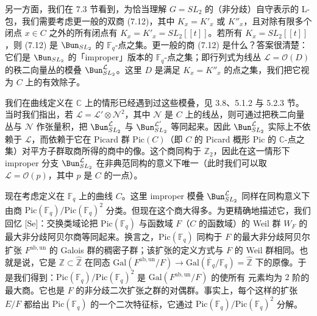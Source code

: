 另一方面，我们在 7.3 节看到，为恰当理解 $G = SL_2$ 的（非分歧）自守表示的 L-包，我们需要考虑更一般的双商 (7.12)，其中 $K_x = K'_x$ 或 $K''_x$，且对除有限多个闭点 $x\in C$ 之外的所有闭点有 $K_x = K'_x = SL_2[[t]]$。若所有 $K_x = SL_2[[t]]$，则 (7.12) 是 $\Bun_{SL_2}$ 的 $\mathbb{F}_q$-点之集。更一般的商 (7.12) 是什么？答案很清楚：它们是 $\Bun_{SL_2}$ 的「improper」版本的 $\mathbb{F}_q$-点之集；即行列式为线丛 $\mathcal{L} = \mathcal{O}(D)$ 的秩二向量丛的模叠 $\Bun^{\mathcal{L}}_{SL_2}$。这里 $D$ 是满足 $K_x = K''_x$ 的点之集，我们把它视为 $C$ 上的有效除子。

我们在曲线定义在 $\mathbb{C}$ 上的情形已经遇到过这些模叠，见 3.8、5.1.2 与 5.2.3 节。当时我们指出，若 $\mathcal{L} = \mathcal{L}'\otimes \mathcal{N}^2$，其中 $\mathcal{N}$ 是 $C$ 上的线丛，则可通过把秩二向量丛与 $\mathcal{N}$ 作张量积，把 $\Bun^{\mathcal{L}}_{SL_2}$ 与 $\Bun^{\mathcal{L}'}_{SL_2}$ 等同起来。因此 $\Bun^{\mathcal{L}}_{SL_2}$ 实际上不依赖于 $\mathcal{L}$，而依赖于它在 Picard 群 $\mathrm{Pic}(C)$（即 $C$ 的 Picard 概形 $\mathrm{Pic}$ 的 $\mathbb{C}$-点之集）对平方子群取商所得的商中的像。这个商同构于 $\mathbb{Z}_2$，因此在这一情形下 improper 分支 $\Bun^{\mathcal{L}}_{SL_2}$ 在非典范同构的意义下唯一（此时我们可以取 $\mathcal{L} = \mathcal{O}(p)$，其中 $p$ 是 $C$ 的一点）。

现在考虑定义在 $\mathbb{F}_q$ 上的曲线 $C$。这里 improper 模叠 $\Bun^{\mathcal{L}}_{SL_2}$ 同样在同构意义下由商 $\mathrm{Pic}(\mathbb{F}_q)/\mathrm{Pic}(\mathbb{F}_q)^2$ 分类。但现在这个商大得多。为更精确地描述它，我们回忆 [Se]：交换类域论把 $\mathrm{Pic}(\mathbb{F}_q)$ 与函数域 $F$（$C$ 的函数域）的 Weil 群 $W_F$ 的最大非分歧阿贝尔商等同起来。换言之，$\mathrm{Pic}(\mathbb{F}_q)$ 同构于 $F$ 的最大非分歧阿贝尔扩张 $F^{\mathrm{ab},\mathrm{un}}$ 的 Galois 群的稠密子群；该扩张的定义方式与 $F$ 的 Weil 群相同。也就是说，它是 $\mathbb{Z}\subset \hat{\mathbb{Z}}$ 在同态 $\mathrm{Gal}(F^{\mathrm{ab},\mathrm{un}}/F)\to \mathrm{Gal}(\overline{\mathbb{F}}_q/\mathbb{F}_q) = \hat{\mathbb{Z}}$ 下的原像。于是我们得到：$\mathrm{Pic}(\mathbb{F}_q)/\mathrm{Pic}(\mathbb{F}_q)^2$ 是 $\mathrm{Gal}(F^{\mathrm{ab},\mathrm{un}}/F)$ 的使所有
元素均为 $2$ 阶的最大商。它也是 $F$ 的非分歧二次扩张之群的对偶群。事实上，每个这样的扩张 $E/F$ 都给出 $\mathrm{Pic}(\mathbb{F}_q)$ 的一个二次特征标，它通过 $\mathrm{Pic}(\mathbb{F}_q)/\mathrm{Pic}(\mathbb{F}_q)^2$ 分解。

